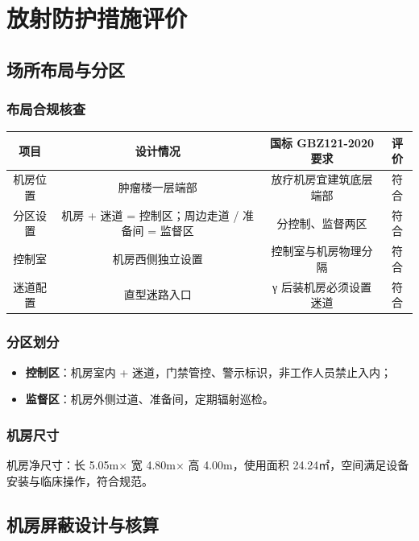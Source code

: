 \chapter{放射防护措施评价}

\section{场所布局与分区}

\subsection{布局合规核查}

\begin{table}[H]
\centering
\begin{tabular}{|c|c|c|c|}
\hline
项目 & 设计情况 & 国标 GBZ121-2020 要求 & 评价 \\
\hline
机房位置 & 肿瘤楼一层端部 & 放疗机房宜建筑底层端部 & 符合 \\
\hline
分区设置 & 机房 + 迷道 = 控制区；周边走道 / 准备间 = 监督区 & 分控制、监督两区 & 符合 \\
\hline
控制室 & 机房西侧独立设置 & 控制室与机房物理分隔 & 符合 \\
\hline
迷道配置 & 直型迷路入口 & γ 后装机房必须设置迷道 & 符合 \\
\hline
\end{tabular}
\end{table}


\subsection{分区划分}

\begin{itemize}
\item \textbf{控制区}：机房室内 + 迷道，门禁管控、警示标识，非工作人员禁止入内；
\item \textbf{监督区}：机房外侧过道、准备间，定期辐射巡检。
\end{itemize}

\subsection{机房尺寸}

机房净尺寸：长 5.05m× 宽 4.80m× 高 4.00m，使用面积 24.24㎡，空间满足设备安装与临床操作，符合规范。

\section{机房屏蔽设计与核算}


